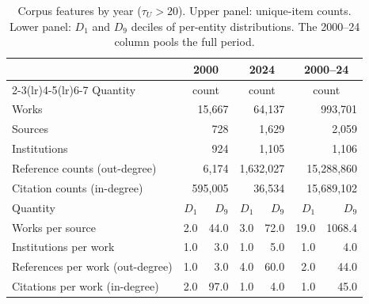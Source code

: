 \begin{table}[htbp]
\centering
\caption{Corpus features by year ($\tau_U > 20$). Upper panel: unique-item counts. Lower panel: $D_1$ and $D_9$ deciles of per-entity distributions. The 2000--24 column pools the full period.}
\label{tab:corpus_features}
\begin{tabular}{lrrrrrr}
\toprule
 & \multicolumn{2}{c}{2000} & \multicolumn{2}{c}{2024} & \multicolumn{2}{c}{2000--24} \\
\cmidrule(lr){2-3}\cmidrule(lr){4-5}\cmidrule(lr){6-7}
Quantity & \multicolumn{2}{c}{count} & \multicolumn{2}{c}{count} & \multicolumn{2}{c}{count} \\
\midrule
Works & \multicolumn{2}{r}{15,667} & \multicolumn{2}{r}{64,137} & \multicolumn{2}{r}{993,701} \\
Sources & \multicolumn{2}{r}{728} & \multicolumn{2}{r}{1,629} & \multicolumn{2}{r}{2,059} \\
Institutions & \multicolumn{2}{r}{924} & \multicolumn{2}{r}{1,105} & \multicolumn{2}{r}{1,106} \\
Reference counts (out-degree) & \multicolumn{2}{r}{6,174} & \multicolumn{2}{r}{1,632,027} & \multicolumn{2}{r}{15,288,860} \\
Citation counts (in-degree) & \multicolumn{2}{r}{595,005} & \multicolumn{2}{r}{36,534} & \multicolumn{2}{r}{15,689,102} \\
\midrule
Quantity & $D_1$ & $D_9$ & $D_1$ & $D_9$ & $D_1$ & $D_9$ \\
\midrule
Works per source & 2.0 & 44.0 & 3.0 & 72.0 & 19.0 & 1068.4 \\
Institutions per work & 1.0 & 3.0 & 1.0 & 5.0 & 1.0 & 4.0 \\
References per work (out-degree) & 1.0 & 3.0 & 4.0 & 60.0 & 2.0 & 44.0 \\
Citations per work (in-degree) & 2.0 & 97.0 & 1.0 & 4.0 & 1.0 & 45.0 \\
\bottomrule
\end{tabular}
\end{table}
